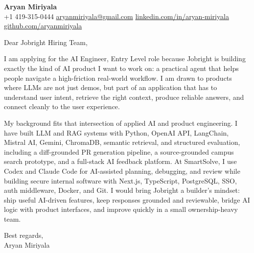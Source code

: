 \documentclass[letterpaper,11pt]{article}
\begin{document}
\begin{center}
    {\Large \textbf{Aryan Miriyala}}\\
    \vspace{2pt}
    +1 419-315-0444 \textbar{} \href{mailto:aryanmiriyala@gmail.com}{aryanmiriyala@gmail.com} \textbar{} \href{https://www.linkedin.com/in/aryan-miriyala-7788a21b6/}{linkedin.com/in/aryan-miriyala} \textbar{} \href{https://github.com/aryanmiriyala}{github.com/aryanmiriyala}
\end{center}

\vspace{10pt}

Dear Jobright Hiring Team,

I am applying for the AI Engineer, Entry Level role because Jobright is building exactly the kind of AI product I want to work on: a practical agent that helps people navigate a high-friction real-world workflow. I am drawn to products where LLMs are not just demos, but part of an application that has to understand user intent, retrieve the right context, produce reliable answers, and connect cleanly to the user experience.

My background fits that intersection of applied AI and product engineering. I have built LLM and RAG systems with Python, OpenAI API, LangChain, Mistral AI, Gemini, ChromaDB, semantic retrieval, and structured evaluation, including a diff-grounded PR generation pipeline, a source-grounded campus search prototype, and a full-stack AI feedback platform. At SmartSolve, I use Codex and Claude Code for AI-assisted planning, debugging, and review while building secure internal software with Next.js, TypeScript, PostgreSQL, SSO, auth middleware, Docker, and Git. I would bring Jobright a builder's mindset: ship useful AI-driven features, keep responses grounded and reviewable, bridge AI logic with product interfaces, and improve quickly in a small ownership-heavy team.

\vspace{8pt}

Best regards,\\
Aryan Miriyala
\end{document}
